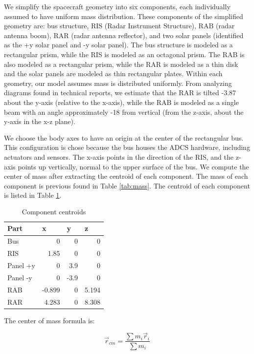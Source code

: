 We simplify the spacecraft geometry into six components, each individually assumed to have uniform mass distribution. These components of the simplified geometry are: bus structure, RIS (Radar Instrument Structure), RAB (radar antenna boom), RAR (radar antenna reflector), and two solar panels (identified as the +y solar panel and -y solar panel). The bus structure is modeled as a rectangular prism, while the RIS is modeled as an octagonal prism. The RAB is also modeled as a rectangular prism, while the RAR is modeled as a thin disk and the solar panels are modeled as thin rectangular plates. Within each geometry, our model assumes mass is distributed uniformly. From analyzing diagrams found in technical reports, we estimate that the RAR is tilted -3.87\degree{} about the y-axis (relative to the x-axis), while the RAB is modeled as a single beam with an angle approximately -18\degree{} from vertical (from the z-axis, about the y-axis in the x-z plane).

We choose the body axes to have an origin at the center of the rectangular bus. This configuration is chose because the bus houses the ADCS hardware, including actuators and sensors. The x-axis points in the direction of the RIS, and the z-axis points up vertically, normal to the upper surface of the bus. We compute the center of mass after extracting the centroid of each component. The mass of each component is previous found in Table \ref{tab:mass}. The centroid of each component is listed in Table \ref{tab:centroid}.

\begin{longtable}{l|r|r|r}
\caption{Component centroids}
\label{tab:centroid}\\
\textbf{Part} & \multicolumn{1}{l}{\textbf{x}} & \multicolumn{1}{l}{\textbf{y}} & \multicolumn{1}{l}{\textbf{z}} \\ \hline
\endfirsthead
%
\endhead
%
Bus      & 0     & 0    & 0    \\
RIS      & 1.85  & 0    & 0    \\
Panel +y & 0     & 3.9  & 0    \\
Panel -y & 0     & -3.9 & 0    \\
RAB      & -0.899 & 0    & 5.194 \\
RAR      & 4.283   & 0    & 8.308
\end{longtable}

The center of mass formula is:

\begin{equation*}
    \Vec{r}_{cm} = \frac{\sum m_{i} \Vec{r}_{i}}{\sum m_{i}}
\end{equation*}

